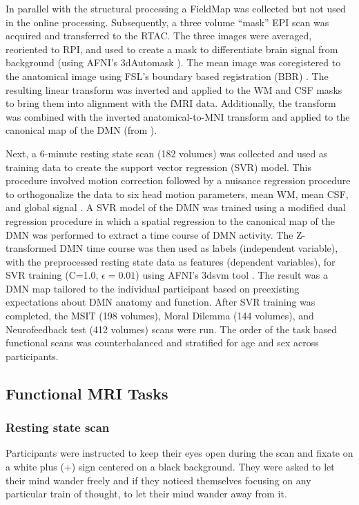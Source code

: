 In parallel with the structural processing a FieldMap was collected but not used in the online processing. Subsequently, a three volume “mask” EPI scan was acquired and transferred to the RTAC. The three images were averaged, reoriented to RPI, and used to create a mask to differentiate brain signal from background (using AFNI’s 3dAutomask \cite{Cox1996}). The mean image was coregistered to the anatomical image using FSL’s boundary based registration (BBR) \cite{Greve2009}. The resulting linear transform was inverted and applied to the WM and CSF masks to bring them into alignment with the fMRI data. Additionally, the transform was combined with the inverted anatomical-to-MNI transform and applied to the canonical map of the DMN (from \cite{Smith2009}).

Next, a 6-minute resting state scan (182 volumes) was collected and used as training data to create the support vector regression (SVR) model. This procedure involved motion correction followed by a nuisance regression procedure to orthogonalize the data to six head motion parameters, mean WM, mean CSF, and global signal \cite{Friston1996,Fox2005,Lund2006}. A SVR model of the DMN was trained using a modified dual regression procedure in which a spatial regression to the canonical map of the DMN was performed to extract a time course of DMN activity. The Z-transformed DMN time course was then used as labels (independent variable), with the preprocessed resting state data as features (dependent variables), for SVR training (C=1.0, $\epsilon = 0.01$) using AFNI’s 3dsvm tool \cite{LaConte2005}. The result was a DMN map tailored to the individual participant based on preexisting expectations about DMN anatomy and function. After SVR training was completed, the MSIT (198 volumes), Moral Dilemma (144 volumes), and Neurofeedback test (412 volumes) scans were run. The order of the task based functional scans was counterbalanced and stratified for age and sex across participants.

\subsection{Functional MRI Tasks}

\subsubsection{Resting state scan}

Participants were instructed to keep their eyes open during the scan and fixate on a white plus (+) sign centered on a black background. They were asked to let their mind wander freely and if they noticed themselves focusing on any particular train of thought, to let their mind wander away from it.


